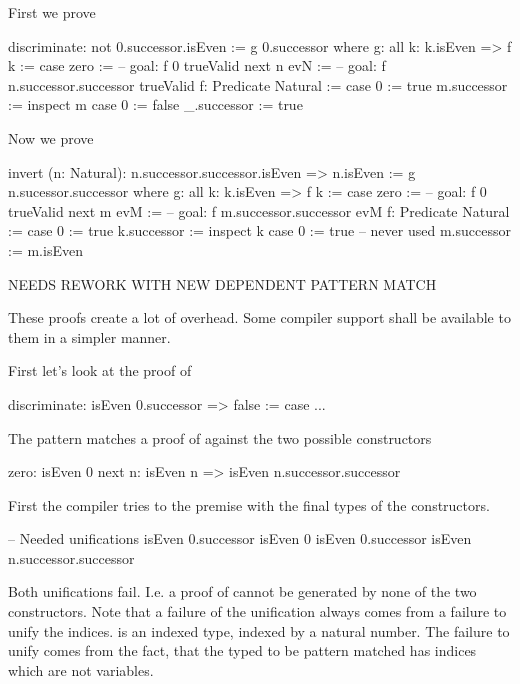 \noindent First we prove 
%
\begin{alba}
    discriminate: not 0.successor.isEven
    :=
        g 0.successor
        where
            g: all k: k.isEven => f k :=
                case
                    zero :=
                        -- goal: f 0
                        trueValid
                    next n evN :=
                        -- goal: f n.successor.successor
                        trueValid
            f: Predicate Natural :=
                case
                    0 :=
                        true
                    m.successor :=
                        inspect m case
                            0 :=
                                false
                            _.successor :=
                                true
\end{alba}




\noindent Now we prove 
%
\begin{alba}
    invert (n: Natural): n.successor.successor.isEven => n.isEven
    :=
        g n.sucessor.successor
        where
            g: all k: k.isEven => f k :=
                case
                    zero :=
                        -- goal: f 0
                        trueValid
                    next m evM :=
                        -- goal: f m.successor.successor
                        evM
            f: Predicate Natural :=
                case
                    0 :=
                        true
                    k.successor :=
                        inspect k case
                            0 :=
                                true -- never used
                            m.successor :=
                                m.isEven
\end{alba}




\noindent NEEDS REWORK WITH NEW DEPENDENT PATTERN MATCH

These proofs create a lot of overhead. Some compiler support shall be available
to them in a simpler manner.

First let's look at the proof of
\begin{alba}
    discriminate: isEven 0.successor => false :=
        case ...
\end{alba}
The pattern matches a proof of  against the two
possible constructors
\begin{alba}
    zero: isEven 0
    next n: isEven n => isEven n.successor.successor
\end{alba}
First the compiler tries to the premise with the final types of the
constructors.
\begin{alba}
    -- Needed unifications
    isEven 0.successor              isEven 0
    isEven 0.successor              isEven n.successor.successor
\end{alba}
Both unifications fail. I.e. a proof of  cannot be
generated by none of the two constructors. Note that a failure of the
unification always comes from a failure to unify the indices.  is
an indexed type, indexed by a natural number. The failure to unify comes from
the fact, that the typed to be pattern matched has indices which are not
variables.

